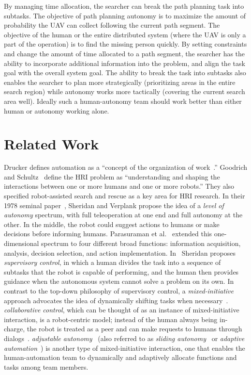 \documentclass[lettersize, apacite, twoside, HRI]{apa_HRI}
\begin{document}
By managing time allocation, the searcher can break the path planning task into subtasks. The objective of path planning autonomy is to maximize the amount of probability the UAV can collect following the current path segment. The objective of the human or the entire distributed system (where the UAV is only a part of the operation) is to find the missing person quickly. By setting constraints and change the amount of time allocated to a path segment, the searcher has the ability to incorporate additional information into the problem, and align the task goal with the overall system goal. The ability to break the task into subtasks also enables the searcher to plan more strategically (prioritizing areas in the entire search region) while autonomy works more tactically (covering the current search area well). Ideally such a human-autonomy team should work better than either human or autonomy working alone.


\section{Related Work}
\label{sec:RelatedWork6}

Drucker defines automation as a ``concept of the organization of work~\cite{Drucker2006Practice}.'' Goodrich and Schultz~\cite{Goodrich2007HRISurvey} define the HRI problem as ``understanding and shaping the interactions between one or more humans and one or more robots.'' They also specified robot-assisted search and rescue as a key area for HRI research. In their 1978 seminal paper~\cite{Sheridan1978Human}, Sheridan and Verplank propose the idea of a \textit{level of autonomy} spectrum, with full teleoperation at one end and full autonomy at the other. In the middle, the robot could suggest actions to humans or make decisions before informing humans. Parasuraman et al.\ \cite{Parasuraman2000Model} extended this one-dimensional spectrum to four different broad functions: information acquisition, analysis, decision selection, and action implementation. In~\cite{Sheridan1992Telerobotics} Sheridan proposes \textit{supervisory control}, in which a human divides the task into a sequence of subtasks that the robot is capable of performing, and the human then provides guidance when the autonomous system cannot solve a problem on its own. In contrast to the top-down philosophy of supervisory control, a \textit{mixed-initiative} approach advocates the idea of dynamically shifting tasks when necessary~\cite{Hearst1999Mixed}. \textit{collaborative control}, which can be thought of as an instance of mixed-initiative interaction, is a robot-centric model; instead of the human always being in-charge, the robot is treated as a peer and can make requests to humans through dialogs~\cite{Fong1999Collaborative}. \textit{adjustable autonomy}~\cite{Dorais2001Designing} (also referred to as \textit{sliding autonomy}~\cite{Dias2008SlidingAutonomy} or \textit{adaptive automation}~\cite{Rouse1988Adaptive}) is another type of mixed-initiative interaction, one that enables the human-automation team to dynamically and adaptively allocate functions and tasks among team members. 
\end{document}
